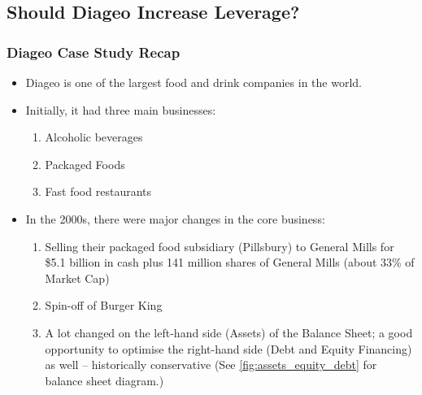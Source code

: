 \subsection*{Should Diageo Increase Leverage?}

\subsubsection*{Diageo Case Study Recap}

\begin{itemize}
    \item Diageo is one of the largest food and drink companies in the world.
    \item Initially, it had three main businesses: 
    \begin{enumerate}
        \item Alcoholic beverages
        \item Packaged Foods
        \item Fast food restaurants
    \end{enumerate}
    \item In the 2000s, there were major changes in the core business:
    \begin{enumerate}
        \item Selling their packaged food subsidiary (Pillsbury) to General Mills for \$5.1 billion in cash plus 141 million shares of General Mills (about 33\% of Market Cap)
        \item Spin-off of Burger King
        \item A lot changed on the left-hand side (Assets) of the Balance Sheet; a good opportunity to optimise the right-hand side (Debt and Equity Financing) as well – historically conservative (See \ref{fig:assets_equity_debt} for balance sheet diagram.)
    \end{enumerate}
\end{itemize}

